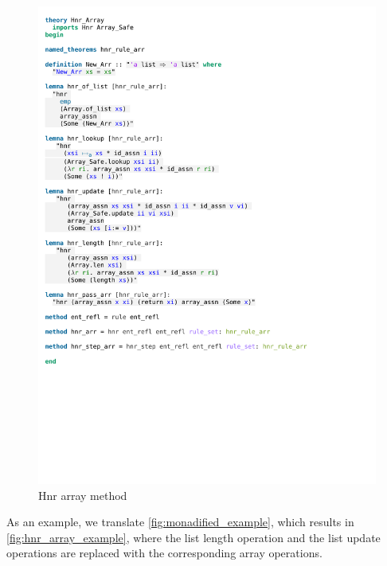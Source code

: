\begin{figure}[htpb]
    \includegraphics[trim={0 9,2cm 0 19cm}, clip, width=1.00\textwidth]{figures/Theory_Hnr_Array.pdf}
    \caption[Hnr array method]{Hnr array method}
    \label{fig:hnr_array_method}
\end{figure}

\noindent As an example, we translate \autoref{fig:monadified_example}, which results in \autoref{fig:hnr_array_example}, where the list length operation and the list update operations are replaced with the corresponding array operations.

